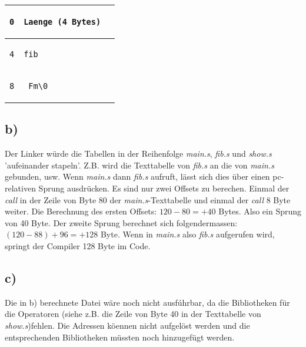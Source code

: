 \documentclass{ti2}
\begin{document}
\begin{tabular}{ | l | l | l|}
\begin{lstlisting}
0
\end{lstlisting} &
\begin{lstlisting}
Laenge (4 Bytes)
\end{lstlisting} &
\begin{lstlisting}
\end{lstlisting} \\ \hline

\begin{lstlisting}
4
\end{lstlisting} &
\begin{lstlisting}
fib_
\end{lstlisting} &
\begin{lstlisting}
\end{lstlisting} \\ \hline

\begin{lstlisting}
8
\end{lstlisting} &
\begin{lstlisting}
_Fm\0
\end{lstlisting} &
\begin{lstlisting}
\end{lstlisting} \\ \hline


\end{tabular}

\subsection*{b)}
Der Linker w\"urde die Tabellen in der Reihenfolge \emph{main.s}, \emph{fib.s} und \emph{show.s} 'aufeinander stapeln'. Z.B. wird die Texttabelle von \emph{fib.s} an die von \emph{main.s} gebunden, usw. Wenn \emph{main.s} dann \emph{fib.s} aufruft, l\"asst sich dies \"uber einen pc-relativen Sprung ausdr\"ucken. Es sind nur zwei Offsets zu berechen. Einmal der \emph{call} in der Zeile von Byte 80 der \emph{main.s}-Texttabelle und einmal der \emph{call} 8 Byte weiter. Die Berechnung des ersten Offsets: $120 - 80 = +40$ Bytes. Also ein Sprung von 40 Byte. Der zweite Sprung berechnet sich folgendermassen: $(120 - 88) + 96 =+128$ Byte. Wenn in \emph{main.s} also \emph{fib.s} aufgerufen wird, springt der Compiler 128 Byte im Code.

\subsection*{c)}
Die in b) berechnete Datei w\"are noch nicht ausf\'uhrbar, da die Bibliotheken f\"ur die Operatoren (siehe z.B. die Zeile von Byte 40 in der Texttabelle von \emph{show.s})fehlen. Die Adressen k\"oennen nicht aufgel\"ost werden und die entsprechenden Bibliotheken m\"ussten noch hinzugef\"ugt werden.
\end{document}
